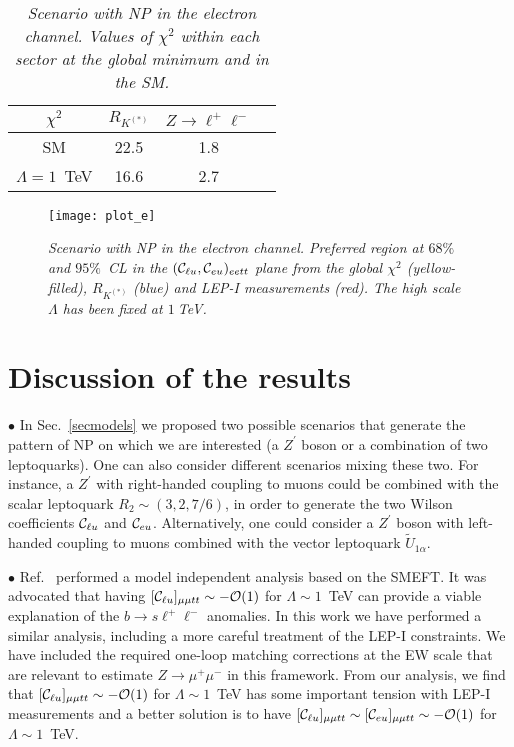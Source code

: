 \documentclass[aps,twocolumn,showpacs,preprintnumbers,amsmath,amssymb,floatfix,nofootinbib]{revtex4-1}
\newcommand{\C}{{\cal C}}
\begin{document}
%
\begin{table}[ht]
\caption{\textit{Scenario with NP in the electron channel. Values of $\chi^2$ within each sector at the global minimum and in the SM.}   \label{tab:chi2b} }
\begin{center}
\begin{tabular}{|c|c|c|c|}
    $\chi^2$  &    $R_{K^{(*)}}$   &   $Z \to \ell^+ \ell^-$  \\    \hline  
       SM  &       22.5  &    1.8 \\ 
   $\Lambda = 1$~TeV   &    16.6   &   2.7  \\
\end{tabular}
\end{center}
\end{table}
%




%
\begin{figure}[htp]
\begin{center}{
\texttt{[image: plot\_e]}
\caption{\textit{Scenario with NP in the electron channel.  Preferred region at $68\%$ and $95\%$~CL in the $(\C_{\ell u}, \C_{eu})_{eett}$ plane from the global $\chi^2$ (yellow-filled), $R_{K^{(*)}}$ (blue) and LEP-I measurements (red).   The high scale $\Lambda$ has been fixed at $1~$TeV. }  \label{fig4}  } }
\end{center}
\end{figure}
%


%
\section{Discussion of the results}  \label{secdisc}
%

$\bullet$  In Sec.~\ref{secmodels} we proposed two possible scenarios that generate the pattern of NP on which we are interested (a $Z^{\prime}$ boson or a combination of two leptoquarks). One can also consider different scenarios mixing these two.   For instance, a $Z^{\prime}$ with right-handed coupling to muons could be combined with the scalar leptoquark $R_2 \sim (3,2,7/6)$, in order to generate the two Wilson coefficients $\C_{\ell u}$ and $\C_{e u}$.  Alternatively, one could consider a $Z^{\prime}$ boson with left-handed coupling to muons combined with the vector leptoquark $\widetilde U_{1\alpha}$.

$\bullet$ Ref.~\cite{Celis:2017doq} performed a model independent analysis based on the SMEFT.   It was advocated that having $[\C_{\ell u}]_{\mu \mu tt} \sim - \mathcal{O}(1)$ for $\Lambda \sim 1$~TeV can provide a viable explanation of the $b \to s \ell^+ \ell^-$ anomalies.    In this work we have performed a similar analysis, including a more careful treatment of the LEP-I constraints.      We have included the required one-loop matching corrections at the EW scale that are relevant to estimate $Z \to \mu^+ \mu^-$ in this framework.     From our analysis, we find that $[\C_{\ell u}]_{\mu \mu tt} \sim - \mathcal{O}(1)$ for $\Lambda \sim 1$~TeV has some important tension with LEP-I measurements and a better solution is to have $[\C_{\ell u}]_{\mu \mu tt} \sim  [\C_{eu}]_{\mu \mu tt}  \sim  - \mathcal{O}(1)$ for $\Lambda \sim 1$~TeV.       
\end{document}
